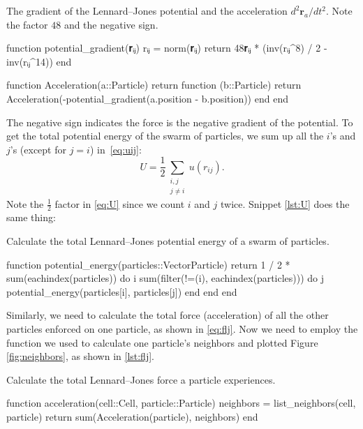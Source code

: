 %
\begin{algorithm}
    \caption{The gradient of the Lennard--Jones potential and the acceleration
        $d^2 \bm{r}_a / d t^2$. Note the factor $48$ and the negative sign.}
    \label{lst:gradient}
    \begin{juliacode}
        function potential_gradient(𝐫ᵢⱼ)
            rᵢⱼ = norm(𝐫ᵢⱼ)
            return 48𝐫ᵢⱼ * (inv(rᵢⱼ^8) / 2 - inv(rᵢⱼ^14))
        end

        function Acceleration(a::Particle)
            return function (b::Particle)
                return Acceleration(-potential_gradient(a.position - b.position))
            end
        end
    \end{juliacode}
\end{algorithm}
%
The negative sign indicates the force is the negative gradient of the potential.
To get the total potential energy of the swarm of particles, we sum up all the $i$'s
and $j$'s (except for $j = i$) in~\eqref{eq:uij}:
%
\begin{equation}\label{eq:U}
    U = \frac{ 1 }{ 2 }\sum_{\substack{i, j\\ j \neq i}} u(r_{ij}).
\end{equation}
%
Note the $\frac{ 1 }{ 2 }$ factor in \eqref{eq:U} since we count $i$ and $j$ twice.
Snippet \ref{lst:U} does the same thing:

\begin{algorithm}
    \caption{Calculate the total Lennard--Jones potential energy of a swarm of particles.}
    \label{lst:U}
    \begin{juliacode}
        function potential_energy(particles::Vector{Particle})
            return 1 / 2 * sum(eachindex(particles)) do i
                sum(filter(!=(i), eachindex(particles))) do j
                    potential_energy(particles[i], particles[j])
                end
            end
        end
    \end{juliacode}
\end{algorithm}

Similarly, we need to calculate the total force (acceleration) of all the other particles
enforced on one particle, as shown in \eqref{eq:flj}. Now we need to employ the
 function we used to calculate one particle's neighbors and plotted
Figure \ref{fig:neighbors}, as shown in \ref{lst:flj}.
%
\begin{algorithm}
    \caption{Calculate the total Lennard--Jones force a particle experiences.}
    \label{lst:flj}
    \begin{juliacode}
        function acceleration(cell::Cell, particle::Particle)
            neighbors = list_neighbors(cell, particle)
            return sum(Acceleration(particle), neighbors)
        end
    \end{juliacode}
\end{algorithm}
%

